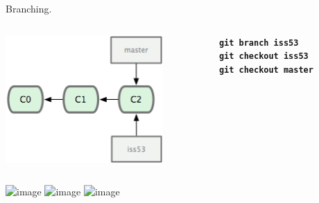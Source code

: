 \documentclass{beamer}
\begin{document}
\begin{frame}{Branching.}
  \begin{columns}
    \begin{column}{0.6\linewidth}
      \begin{center}
        \includegraphics[width=6cm]{figs/18333fig0311-tn}
      \end{center}
    \end{column}
    \begin{column}{0.45\linewidth}
        \texttt{\textbf{git branch iss53}}\\
        \texttt{\textbf{git checkout iss53}}\\
        \texttt{\textbf{git checkout master}}
    \end{column}
  \end{columns}
  \begin{center}
    \includegraphics<1>[width=9cm]{figs/git-branch}
    \includegraphics<2>[width=9cm]{figs/git-checkout}
    \includegraphics<3>[width=9cm]{figs/git-branch}
  \end{center}
\end{frame}
\end{document}
